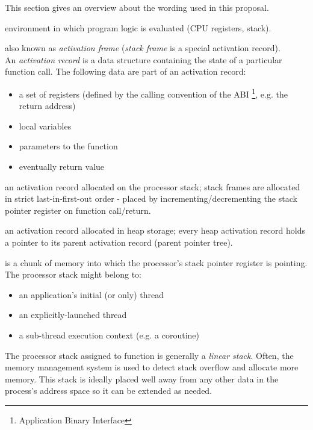 This section gives an overview about the wording used in this proposal.

environment in which program logic is evaluated (CPU registers, stack).

also known as \emph{activation frame} (\emph{stack frame}
is a special activation record).\\
An \emph{activation record} is a data structure containing the state of a
particular function call. The following data are part of an activation record:
\begin{itemize}
    \item a set of registers (defined by the calling convention of the ABI
        \footnote{Application Binary Interface}, e.g. the return address)
    \item local variables
    \item parameters to the function
    \item eventually return value
\end{itemize}

an activation record allocated on the processor stack; stack frames are
allocated in strict last-in-first-out order - placed by
incrementing/decrementing the stack pointer register on function call/return.

an activation record allocated in heap storage; every heap activation record
holds a pointer to its parent activation record (parent pointer tree).

is a chunk of memory into which the processor's stack pointer register is
pointing. The processor stack might belong to:
\begin{itemize}
    \item an application's initial (or only) thread
    \item an explicitly-launched thread
    \item a sub-thread execution context (e.g. a coroutine)
\end{itemize}

The processor stack assigned to function \main is generally a \emph{linear
stack}. Often, the memory management system is used to detect stack
overflow and allocate more memory. This stack is ideally placed well away from
any other data in the process's address space so it can be extended as needed.

